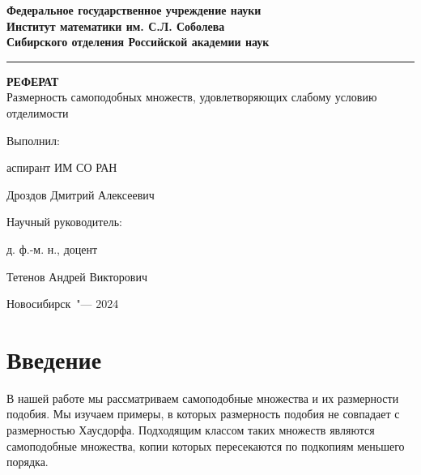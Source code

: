 \documentclass[a4paper,14pt]{extarticle} %
\newcommand{\0}{\varnothing}
\newcommand{\8}{\infty}
\theoremstyle{definition}
\begin{document}
\thispagestyle{empty}
\begin{center}
\textbf{
Федеральное государственное учреждение науки\\
Институт математики им. С.Л. Соболева\\
Сибирского отделения Российской академии наук}
\end{center}

\noindent\rule{\textwidth}{1pt} %

\vspace{0pt plus4fill}


\begin{center}
\textbf {\large %
РЕФЕРАТ}\\
{\large Размерность самоподобных множеств, удовлетворяющих слабому условию отделимости}
\end{center}

\vspace{0pt plus4fill}

\noindent 
\hspace{8cm} Выполнил:

\hspace{8cm} аспирант ИМ СО РАН

\hspace{8cm} Дроздов Дмитрий Алексеевич


\vspace{0pt plus1fill}

\noindent 
\hspace{8cm} Научный руководитель:

\hspace{8cm} д. ф.-м. н., доцент

\hspace{8cm} Тетенов Андрей Викторович


\vspace{0pt plus4fill}
{\centering Новосибирск\ "--- 2024\par}

\newpage
\thispagestyle{empty}
\tableofcontents

\newpage
\section*{Введение}
В нашей работе мы рассматриваем самоподобные множества и их размерности подобия. 
Мы изучаем примеры, в которых размерность подобия не совпадает с размерностью Хаусдорфа.
Подходящим классом таких множеств являются самоподобные множества, копии которых пересекаются по подкопиям меньшего порядка.
\end{document}
